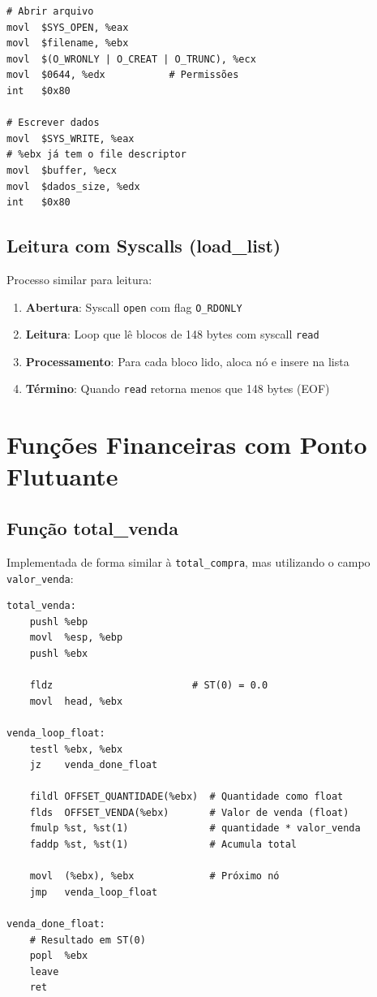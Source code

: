 \documentclass[12pt]{article}
\begin{document}
\begin{verbatim}
# Abrir arquivo
movl  $SYS_OPEN, %eax
movl  $filename, %ebx
movl  $(O_WRONLY | O_CREAT | O_TRUNC), %ecx
movl  $0644, %edx           # Permissões
int   $0x80

# Escrever dados
movl  $SYS_WRITE, %eax
# %ebx já tem o file descriptor
movl  $buffer, %ecx
movl  $dados_size, %edx
int   $0x80
\end{verbatim}

\subsection{Leitura com Syscalls (load\_list)}
Processo similar para leitura:

\begin{enumerate}
    \item \textbf{Abertura}: Syscall \texttt{open} com flag \texttt{O\_RDONLY}
    \item \textbf{Leitura}: Loop que lê blocos de 148 bytes com syscall \texttt{read}
    \item \textbf{Processamento}: Para cada bloco lido, aloca nó e insere na lista
    \item \textbf{Término}: Quando \texttt{read} retorna menos que 148 bytes (EOF)
\end{enumerate}

\section{Funções Financeiras com Ponto Flutuante}

\subsection{Função total\_venda}
Implementada de forma similar à \texttt{total\_compra}, mas utilizando o campo \texttt{valor\_venda}:

\begin{verbatim}
total_venda:
    pushl %ebp
    movl  %esp, %ebp
    pushl %ebx
    
    fldz                        # ST(0) = 0.0
    movl  head, %ebx

venda_loop_float:
    testl %ebx, %ebx
    jz    venda_done_float
    
    fildl OFFSET_QUANTIDADE(%ebx)  # Quantidade como float
    flds  OFFSET_VENDA(%ebx)       # Valor de venda (float)
    fmulp %st, %st(1)              # quantidade * valor_venda
    faddp %st, %st(1)              # Acumula total
    
    movl  (%ebx), %ebx             # Próximo nó
    jmp   venda_loop_float

venda_done_float:
    # Resultado em ST(0)
    popl  %ebx
    leave
    ret
\end{verbatim}
\end{document}
